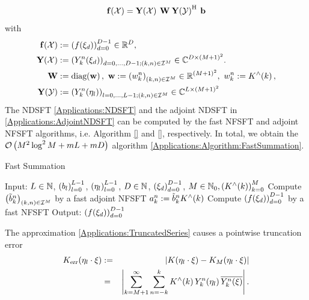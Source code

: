 \[
  \mathbf{f}{\hspace{-0.4ex}}\left(\mathcal{X}\right) = \mathbf{Y}{\hspace{-0.4ex}}\left(\mathcal{X}\right) \: \mathbf{W} \: \mathbf{Y}{\hspace{-0.4ex}}\left(\mathcal{Y}\right)^{\text{\rm{H}}} \: \mathbf{b}
\]
with
\begin{align}
  \nonumber
  \fun{\V{f}}{\mathcal{X}} & := \paren{\fun{f}{\V{\xi}_{d}}}_{d=0}^{D-1} \in \R^D,\\
  \nonumber
  \fun{\V{Y}}{\mathcal{X}} & := \paren{\fun{Y_k^n}{\V{\xi}_{d}}}_{d=0,\ldots,D-1; \paren{k,n} \in \mathcal{I}^M} \in \C^{D \times \paren{M+1}^2}. \\
  \nonumber
  \V{W} & := \fun{\diag}{\V{w}},\ \V{w} := \paren{w_{k}^n}_{\paren{k,n} \in \mathcal{I}^M} \in \R^{(M+1)^2},\ w_{k}^n := \fun{K^{\wedge}}{k}, \\
  \nonumber
  \fun{\V{Y}}{\mathcal{Y}} & := \paren{\fun{Y_k^n}{\V{\eta}_{l}}}_{l=0,\ldots,L-1; \paren{k,n} \in \mathcal{I}^M} \in \C^{L \times \paren{M+1}^2}
\end{align}
The NDSFT \eqref{Applications:NDSFT} and the adjoint NDSFT in \eqref{Applications:AdjointNDSFT} can be computed by the fast NFSFT and adjoint NFSFT algorithms, i.e. Algorithm \ref{} and \ref{}, respectively. In total, we obtain the $\mathcal{O}\left(M^2 \log^2 M + mL + mD\right)$ algorithm \ref{Applications:Algorithm:FastSummation}.
\begin{algorithm}[tb]
  \caption{Fast Summation}
  \label{Applications:Algorithm:FastSummation}    
  \begin{algorithmic}
    \STATE  Input:  $L \in \mathbb{N}$, $\left(b_{l}\right)_{l=0}^{L-1}$, $\left(\mathbf{\eta}_{l}\right)_{l=0}^{L-1}$, 
                    $D \in \mathbb{N}$, $\left(\mathbf{\xi}_{d}\right)_{d=0}^{D-1}$, $M \in \mathbb{N}_{0}, \left(K^{\wedge}{\hspace{-0.4ex}}\left(k\right)\right)_{k=0}^M$
    \STATE
    \STATE Compute $\left(\tilde{b}_{k}^n\right)_{\left(k,n\right) \in \mathcal{I}^M}$ by a fast adjoint NFSFT
    \STATE 
        \STATE $a_{k}^n := \tilde{b}_{k}^n K^{\wedge}{\hspace{-0.4ex}}\left(k\right)$
      \ENDFOR
    \ENDFOR
    \STATE
    \STATE Compute $\left(f{\hspace{-0.4ex}}\left(\mathbf{\xi}_{d}\right)\right)_{d=0}^{D-1}$ by a fast NFSFT
    \STATE
    \STATE Output: $\left(f{\hspace{-0.4ex}}\left(\mathbf{\xi}_{d}\right)\right)_{d=0}^{D-1}$
\end{algorithmic}
\end{algorithm}
The approximation \eqref{Applications:TruncatedSeries} causes a pointwise truncation error 
\begin{eqnarray*}
  K_{\text{\textsl{err}}}{\hspace{-0.4ex}}\left(\mathbf{\eta}_{l} \cdot \mathbf{\xi}\right) 
    & := & \left\vert K{\hspace{-0.4ex}}\left(\mathbf{\eta}_{l} \cdot \mathbf{\xi}\right) - K_{M}{\hspace{-0.4ex}}\left(\mathbf{\eta}_{l} \cdot \mathbf{\xi}\right)\right\vert\\
    &  = & \left\vert\sum_{k=M+1}^{\infty} \sum_{n=-k}^k K^{\wedge}{\hspace{-0.4ex}}\left(k\right) Y_{k}^n{\hspace{-0.4ex}}\left(\mathbf{\eta}_{l}\right) \overline{Y_{k}^n{\hspace{-0.4ex}}\left(\mathbf{\xi}\right)}\right\vert.
\end{eqnarray*}
